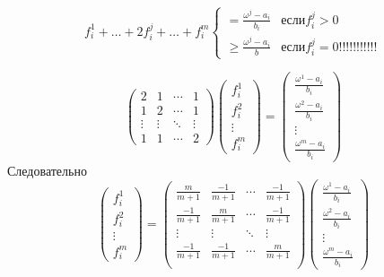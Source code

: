 \documentclass[12pt,a4paper,titlepage,oneside]{book}
\theoremstyle{definition}
\theoremstyle{plain}
\theoremstyle{remark}
\theoremstyle{remark}
\theoremstyle{plain}
\theoremstyle{plain}
\begin{document}
\begin{equation*}
f_i^1+ \dots + 2f_i^j+ \dots +  f_i^m  \begin{cases} = \frac{\omega^j -a_i}{b_i} & если f_i^j > 0\\
\geq \frac{\omega^j -a_i}{b} & если f_i^j = 0 \text{!!!!!!!!!!!}
\end{cases}
\end{equation*}

\begin{equation*}
\begin{pmatrix}
2 & 1 & \cdots & 1\\
1 & 2 & \cdots & 1\\
\vdots & \vdots & \ddots & \vdots\\
1 & 1 & \cdots & 2 
\end{pmatrix}
\begin{pmatrix}
f_i^1 \\ f_i^2 \\ \vdots\\ f_i^m 
\end{pmatrix}
=
\begin{pmatrix}
\frac{\omega^1 - a_i}{b_i} \\ \frac{\omega^2 - a_i}{b_i} \\ \vdots \\ \frac{\omega^m - a_i}{b_i}
\end{pmatrix}
\end{equation*}
Следовательно
\begin{equation*}
\begin{pmatrix}
f_i^1 \\ f_i^2 \\ \vdots\\ f_i^m 
\end{pmatrix} 
=\begin{pmatrix}
\frac{m}{m+1} & \frac{-1}{m+1} & \cdots & \frac{-1}{m+1} \\
\frac{-1}{m+1} & \frac{m}{m+1} & \cdots & \frac{-1}{m+1} \\
\vdots & \vdots & \ddots & \vdots\\
\frac{-1}{m+1} & \frac{-1}{m+1} & \cdots & \frac{m}{m+1} \\
\end{pmatrix}
\begin{pmatrix}
\frac{\omega^1 - a_i}{b_i} \\ \frac{\omega^2 - a_i}{b_i} \\ \vdots \\ \frac{\omega^m - a_i}{b_i}
\end{pmatrix}
\end{equation*}
\end{document}
